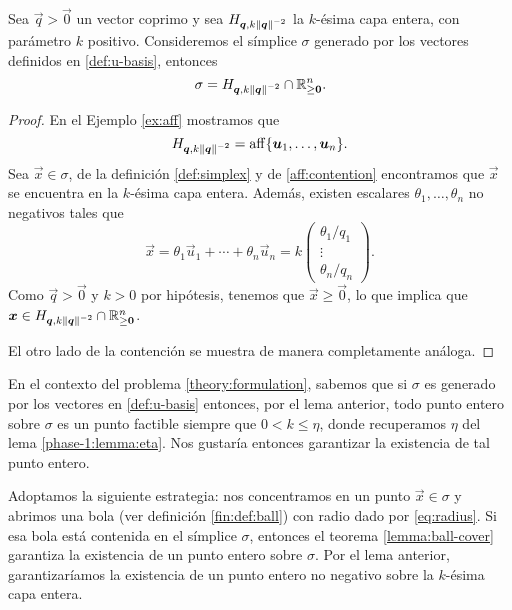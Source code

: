 \begin{lemma}
	\label{lemma:sigmachar1}
	Sea $\vec{q} > \vec{0}$ un vector coprimo y sea $H_{\boldsymbol{q}, k\left\lVert \boldsymbol{q} \right\rVert^{-2}}$ la
	$k$-ésima capa entera, con parámetro $k$ positivo. Consideremos el símplice $\sigma$ generado por
	los vectores definidos en \eqref{def:u-basis}, entonces
	\begin{equation*}
		\sigma = H_{\boldsymbol{q}, k\left\lVert \boldsymbol{q} \right\rVert^{-2}} \cap \mathbb{R}^n_{\geq \boldsymbol{0}}.
	\end{equation*}
\end{lemma}
\begin{proof}
	En el Ejemplo \ref{ex:aff} mostramos que
	\begin{equation*}
		\label{eq:aff-layer}
		H_{\boldsymbol{q}, k\left\lVert \boldsymbol{q} \right\rVert^{-2}} = \operatorname{aff}\lbrace \boldsymbol{u}_1, \ldots, \boldsymbol{u}_n \rbrace.
	\end{equation*}
	Sea $\vec{x} \in \sigma$, de la definición \ref{def:simplex} y de \eqref{aff:contention} encontramos
	que $\vec{x}$ se encuentra en la $k$-ésima capa entera. Además, existen escalares $\theta_1,
	\ldots, \theta_n$ no negativos tales que
	\begin{equation*}
		\vec{x} = \theta_1\vec{u}_1 + \cdots + \theta_n\vec{u}_n
		= k\begin{pmatrix}
			\theta_1 / q_1 \\
			\vdots \\
			\theta_n / q_n
		\end{pmatrix}.
	\end{equation*}
	Como $\vec{q} > \vec{0}$ y $k > 0$ por hipótesis, tenemos que $\vec{x} \geq \vec{0}$, lo que
	implica que $\boldsymbol{x} \in H_{\boldsymbol{q}, k\left\lVert \boldsymbol{q} \right\rVert^{-2}} \cap \mathbb{R}^n_{\geq \boldsymbol{0}}$.

	El otro lado de la contención se muestra de manera completamente análoga.
\end{proof}

En el contexto del problema \eqref{theory:formulation}, sabemos que si $\sigma$ es generado por los
vectores en \eqref{def:u-basis} entonces, por el lema anterior, todo punto entero sobre $\sigma$ es
un punto factible siempre que $0 < k \leq \eta$, donde recuperamos $\eta$ del lema
\ref{phase-1:lemma:eta}. Nos gustaría entonces garantizar la existencia de tal punto entero.

Adoptamos la siguiente estrategia: nos concentramos en un punto $\vec{x} \in \sigma$ y abrimos una
bola (ver definición \ref{fin:def:ball}) con radio dado por \eqref{eq:radius}. Si esa bola está
contenida en el símplice $\sigma$, entonces el teorema \ref{lemma:ball-cover} garantiza la
existencia de un punto entero sobre $\sigma$. Por el lema anterior, garantizaríamos la
existencia de un punto entero no negativo sobre la $k$-ésima capa entera.

